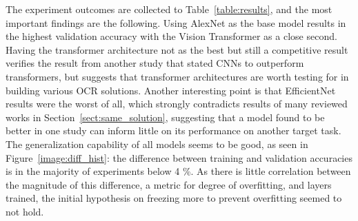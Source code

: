 \documentclass[english,twoside,openright]{UH_DS_MSc}
\begin{document}
The experiment outcomes are collected to Table~\ref{table:results}, and 
the most important findings are the following. Using AlexNet as the base model results in the highest 
validation accuracy with the Vision Transformer as a close second. Having the transformer 
architecture not as the best but still a competitive result verifies the result 
from another study that stated CNNs to outperform transformers, but suggests 
that transformer architectures are worth testing for in building various OCR
solutions. Another interesting point is that EfficientNet results were the worst of all, 
which strongly contradicts results of many reviewed works in Section~\ref{sect:same_solution},
suggesting that a model found to be better in one study can inform little on its performance on another target task.
The generalization capability of all models seems to be good, as seen in Figure~\ref{image:diff_hist}:
the difference between training and validation accuracies is in the majority of 
experiments below 4 \%. As there is little correlation between the magnitude of this difference, 
a metric for degree of overfitting, and layers trained, the initial hypothesis on freezing more to prevent overfitting
seemed to not hold.
\end{document}
